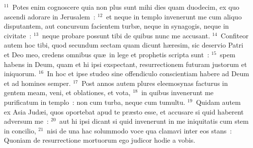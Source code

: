 ${}^{11}$~Potes enim cognoscere quia non plus sunt mihi dies quam duodecim, ex quo ascendi adorare in Jerusalem~:
${}^{12}$~et neque in templo invenerunt me cum aliquo disputantem, aut concursum facientem turb\ae , neque in synagogis, neque in civitate~:
${}^{13}$~neque probare possunt tibi de quibus nunc me accusant.
${}^{14}$~Confiteor autem hoc tibi, quod secundum sectam quam dicunt h\ae resim, sic deservio Patri et Deo meo, credens omnibus qu\ae\ in lege et prophetis scripta sunt~:
${}^{15}$~spem habens in Deum, quam et hi ipsi exspectant, resurrectionem futuram justorum et iniquorum.
${}^{16}$~In hoc et ipse studeo sine offendiculo conscientiam habere ad Deum et ad homines semper.
${}^{17}$~Post annos autem plures eleemosynas facturus in gentem meam, veni, et oblationes, et vota,
${}^{18}$~in quibus invenerunt me purificatum in templo~: non cum turba, neque cum tumultu.
${}^{19}$~Quidam autem ex Asia Jud\ae i, quos oportebat apud te pr\ae sto esse, et accusare si quid haberent adversum me~:
${}^{20}$~aut hi ipsi dicant si quid invenerunt in me iniquitatis cum stem in concilio,
${}^{21}$~nisi de una hac solummodo voce qua clamavi inter eos stans~: Quoniam de resurrectione mortuorum ego judicor hodie a vobis.


